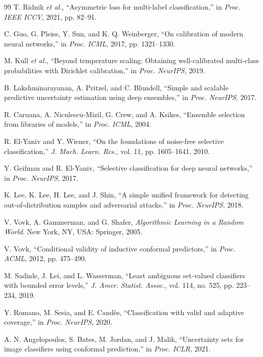 \documentclass[journal]{IEEEtran}
\begin{document}
\begin{thebibliography}{99}
 T. Ridnik \emph{et al.}, ``Asymmetric loss for multi-label
classification,'' in \emph{Proc. IEEE ICCV}, 2021, pp. 82--91.

 C. Guo, G. Pleiss, Y. Sun, and K. Q. Weinberger, ``On
calibration of modern neural networks,'' in \emph{Proc. ICML}, 2017, pp. 1321--1330.

 M. Kull \emph{et al.}, ``Beyond temperature scaling: Obtaining
well-calibrated multi-class probabilities with Dirichlet calibration,'' in \emph{Proc.
NeurIPS}, 2019.

 B. Lakshminarayanan, A. Pritzel, and C. Blundell,
``Simple and scalable predictive uncertainty estimation using deep ensembles,'' in
\emph{Proc. NeurIPS}, 2017.

 R. Caruana, A. Niculescu-Mizil, G. Crew, and A. Ksikes,
``Ensemble selection from libraries of models,'' in \emph{Proc. ICML}, 2004.

 R. El-Yaniv and Y. Wiener, ``On the foundations of
noise-free selective classification,'' \emph{J. Mach. Learn. Res.}, vol. 11, pp. 1605--1641,
2010.

 Y. Geifman and R. El-Yaniv, ``Selective classification for
deep neural networks,'' in \emph{Proc. NeurIPS}, 2017.

 K. Lee, K. Lee, H. Lee, and J. Shin, ``A simple unified
framework for detecting out-of-distribution samples and adversarial attacks,'' in \emph{Proc.
NeurIPS}, 2018.

 V. Vovk, A. Gammerman, and G. Shafer, \emph{Algorithmic
Learning in a Random World}. New York, NY, USA: Springer, 2005.

 V. Vovk, ``Conditional validity of inductive conformal
predictors,'' in \emph{Proc. ACML}, 2012, pp. 475--490.

 M. Sadinle, J. Lei, and L. Wasserman, ``Least ambiguous set-valued
classifiers with bounded error levels,'' \emph{J. Amer. Statist. Assoc.}, vol. 114, no. 525,
pp. 223--234, 2019.

 Y. Romano, M. Sesia, and E. Cand\`{e}s, ``Classification with valid
and adaptive coverage,'' in \emph{Proc. NeurIPS}, 2020.

 A. N. Angelopoulos, S. Bates, M. Jordan, and J. Malik,
``Uncertainty sets for image classifiers using conformal prediction,'' in \emph{Proc. ICLR},
2021.


\end{thebibliography}
\end{document}
